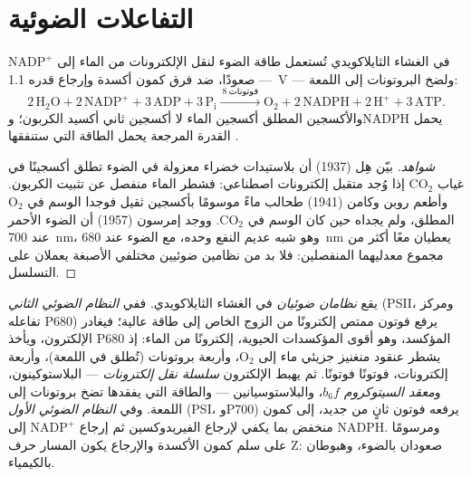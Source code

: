 \section{التفاعلات الضوئية}

\begin{proposition}\label{prop:b1:photosynthesis:lightreactions}
في الغشاء الثايلاكويدي تُستعمل طاقة الضوء لنقل الإلكترونات من الماء
إلى $\mathrm{NADP^+}$ --- صعودًا، ضد فرق كمون أكسدة وإرجاع قدره
\qty{1.1}{V} --- ولضخ البروتونات إلى اللمعة:
\[
2\,\mathrm{H_2O} + 2\,\mathrm{NADP^+} + 3\,\mathrm{ADP} + 3\,\mathrm{P_i}
\xrightarrow{\ 8\ \text{فوتونات}\ }
\mathrm{O_2} + 2\,\mathrm{NADPH} + 2\,\mathrm{H^+} + 3\,\mathrm{ATP} .
\]
والأكسجين المطلق أكسجين الماء لا أكسجين ثاني أكسيد الكربون؛ وNADPH
يحمل القدرة المرجعة  يحمل الطاقة التي ستنفقها .
\end{proposition}
\begin{proof}[شواهد]
بيّن هِل (1937) أن بلاستيدات خضراء معزولة في الضوء تطلق أكسجينًا في
غياب $\mathrm{CO_2}$ إذا وُجد متقبل إلكترونات اصطناعي: فشطر الماء
منفصل عن تثبيت الكربون. وأطعم روبن وكامن (1941) طحالب ماءً موسومًا
بأكسجين ثقيل فوجدا الوسم في $\mathrm{O_2}$ المطلق، ولم يجداه حين كان
الوسم في $\mathrm{CO_2}$. ووجد إمرسون (1957) أن الضوء الأحمر عند
\qty{700}{nm}، وهو شبه عديم النفع وحده، مع الضوء عند \qty{680}{nm}
يعطيان معًا أكثر من مجموع معدليهما المنفصلين: فلا بد من نظامين ضوئيين
مختلفي الأصبغة يعملان على التسلسل.
\end{proof}

\begin{definition}\label{def:b1:photosynthesis:zscheme}
يقع \emph{نظامان ضوئيان} في الغشاء الثايلاكويدي. ففي \emph{النظام
الضوئي الثاني} (PSII، ومركز تفاعله P680) يرفع فوتون ممتص إلكترونًا من
الزوج الخاص إلى طاقة عالية؛ فيغادر الإلكترون، ويأخذ P680 المؤكسد،
وهو أقوى المؤكسدات الحيوية، إلكترونًا من الماء: إذ يشطر عنقود منغنيز
جزيئي ماء إلى $\mathrm{O_2}$، وأربعة بروتونات (تُطلق في اللمعة)،
وأربعة إلكترونات، فوتونًا فوتونًا. ثم يهبط الإلكترون \emph{سلسلة نقل
إلكترونات} --- البلاستوكينون، و\emph{معقد السيتوكروم $b_6f$}،
والبلاستوسيانين --- والطاقة التي يفقدها تضخ بروتونات إلى اللمعة. وفي
\emph{النظام الضوئي الأول} (PSI، وP700) يرفعه فوتون ثانٍ من جديد،
إلى كمون منخفض بما يكفي لإرجاع الفيريدوكسين ثم إرجاع
$\mathrm{NADP^+}$ إلى NADPH. ومرسومًا على سلم كمون الأكسدة والإرجاع
يكون المسار حرف Z: صعودان بالضوء، وهبوطان بالكيمياء.
\end{definition}

